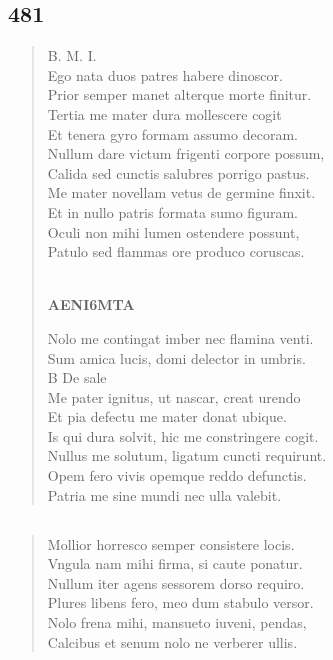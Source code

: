 \documentclass[11pt, a4paper]{report}
\begin{document}
            \subsection*{481}
      \begin{verse}
      B. M. I. \\ Ego nata duos patres habere dinoscor. \\ Prior semper manet alterque morte finitur. \\ Tertia me mater dura mollescere cogit \\ Et tenera gyro formam assumo decoram. \\ Nullum dare victum frigenti corpore possum, \\ Calida sed cunctis salubres porrigo pastus. \\ Me mater novellam vetus de germine finxit. \\ Et in nullo patris formata sumo figuram. \\ Oculi non mihi lumen ostendere possunt, \\ Patulo sed flammas ore produco coruscas. \\ 
        ﻿\pagebreak 
    \begin{center} \textbf{AENI6MTA} \end{center} \marginpar{[352]} Nolo me contingat imber nec flamina venti. \\ Sum amica lucis, domi delector in umbris. \\ B De sale \\ Me pater ignitus, ut nascar, creat urendo \\ Et pia defectu me mater donat ubique. \\ Is qui dura solvit, hic me constringere cogit. \\ Nullus me solutum, ligatum cuncti requirunt. \\ Opem fero vivis opemque reddo defunctis. \\ Patria me sine mundi nec ulla valebit. \\ 
      \end{verse}
  
            \subsection*{}
      \begin{verse}
      Mollior horresco semper consistere locis. \\ Vngula nam mihi firma, si caute ponatur. \\ Nullum iter agens sessorem dorso requiro. \\ Plures libens fero, meo dum stabulo versor. \\ Nolo frena mihi, mansueto iuveni, pendas, \\ Calcibus et senum nolo ne verberer ullis. \\ 
      \end{verse}
  
\end{document}
